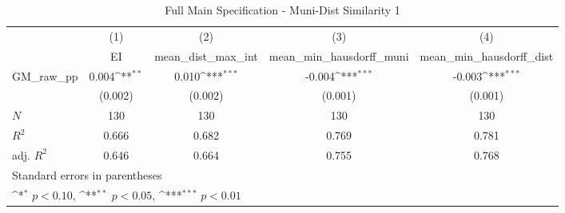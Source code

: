 \begin{table}[htbp]\centering
\def\sym#1{\ifmmode^{#1}\else\(^{#1}\)\fi}
\caption{Full Main Specification - Muni-Dist Similarity 1}
\begin{tabular}{l*{4}{c}}
\hline\hline
            &\multicolumn{1}{c}{(1)}&\multicolumn{1}{c}{(2)}&\multicolumn{1}{c}{(3)}&\multicolumn{1}{c}{(4)}\\
            &\multicolumn{1}{c}{EI}&\multicolumn{1}{c}{mean\_dist\_max\_int}&\multicolumn{1}{c}{mean\_min\_hausdorff\_muni}&\multicolumn{1}{c}{mean\_min\_hausdorff\_dist}\\
\hline
GM\_raw\_pp   &       0.004\sym{**} &       0.010\sym{***}&      -0.004\sym{***}&      -0.003\sym{***}\\
            &     (0.002)         &     (0.002)         &     (0.001)         &     (0.001)         \\
\hline
\(N\)       &         130         &         130         &         130         &         130         \\
\(R^{2}\)   &       0.666         &       0.682         &       0.769         &       0.781         \\
adj. \(R^{2}\)&       0.646         &       0.664         &       0.755         &       0.768         \\
\hline\hline
\multicolumn{5}{l}{\footnotesize Standard errors in parentheses}\\
\multicolumn{5}{l}{\footnotesize \sym{*} \(p<0.10\), \sym{**} \(p<0.05\), \sym{***} \(p<0.01\)}\\
\end{tabular}
\end{table}
